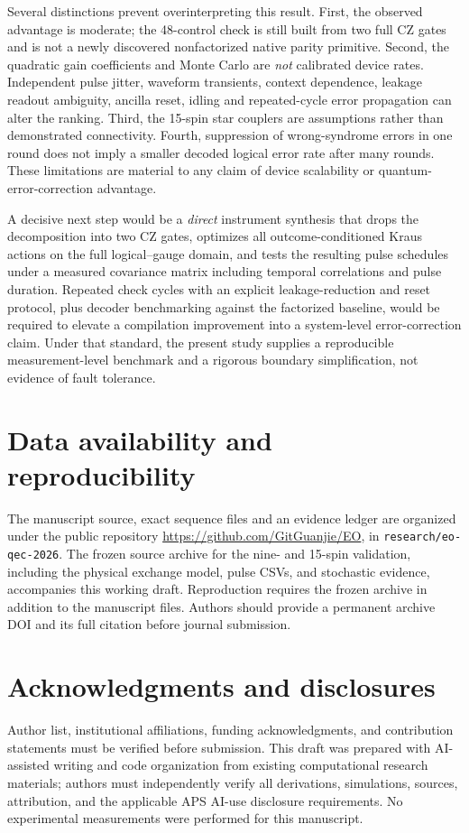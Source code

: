 \documentclass[aps,prx,twocolumn,superscriptaddress,10pt,longbibliography,floatfix]{revtex4-2}
\begin{document}
Several distinctions prevent overinterpreting this result. First, the observed advantage is moderate; the 48-control check is still built from two full CZ gates and is not a newly discovered nonfactorized native parity primitive. Second, the quadratic gain coefficients and Monte Carlo are \emph{not} calibrated device rates. Independent pulse jitter, waveform transients, context dependence, leakage readout ambiguity, ancilla reset, idling and repeated-cycle error propagation can alter the ranking. Third, the 15-spin star couplers are assumptions rather than demonstrated connectivity. Fourth, suppression of wrong-syndrome errors in one round does not imply a smaller decoded logical error rate after many rounds. These limitations are material to any claim of device scalability or quantum-error-correction advantage.

A decisive next step would be a \emph{direct} instrument synthesis that drops the decomposition into two CZ gates, optimizes all outcome-conditioned Kraus actions on the full logical--gauge domain, and tests the resulting pulse schedules under a measured covariance matrix including temporal correlations and pulse duration. Repeated check cycles with an explicit leakage-reduction and reset protocol, plus decoder benchmarking against the factorized baseline, would be required to elevate a compilation improvement into a system-level error-correction claim. Under that standard, the present study supplies a reproducible measurement-level benchmark and a rigorous boundary simplification, not evidence of fault tolerance.

\section*{Data availability and reproducibility}
The manuscript source, exact sequence files and an evidence ledger are organized under the public repository \url{https://github.com/GitGuanjie/EO}, in \texttt{research/eo-qec-2026}. The frozen source archive for the nine- and 15-spin validation, including the physical exchange model, pulse CSVs, and stochastic evidence, accompanies this working draft. Reproduction requires the frozen archive in addition to the manuscript files. Authors should provide a permanent archive DOI and its full citation before journal submission.

\section*{Acknowledgments and disclosures}
Author list, institutional affiliations, funding acknowledgments, and contribution statements must be verified before submission. This draft was prepared with AI-assisted writing and code organization from existing computational research materials; authors must independently verify all derivations, simulations, sources, attribution, and the applicable APS AI-use disclosure requirements. No experimental measurements were performed for this manuscript.
\end{document}
